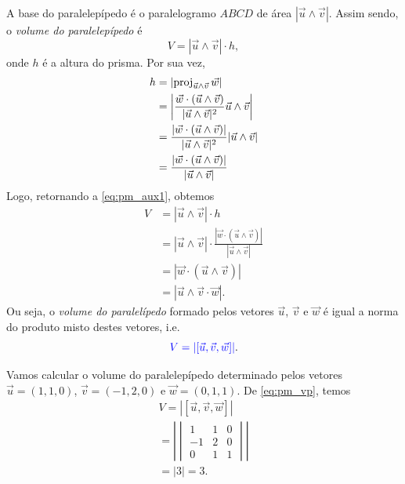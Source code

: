 A base do paralelepípedo é o paralelogramo $ABCD$ de área $|\vec{u}\land\vec{v}|$. Assim sendo, o \emph{volume do paralelepípedo} é
\begin{equation}\label{eq:pm_aux1}
  V = |\vec{u}\land\vec{v}|\cdot h,
\end{equation}
onde $h$ é a altura do prisma. Por sua vez,
\begin{align}
  h &= \left|\operatorname{proj}_{\vec{u}\land\vec{v}}\vec{w}\right| \\
    &= \left|\frac{\vec{w}\cdot(\vec{u}\land\vec{v})}{|\vec{u}\land\vec{v}|^2}\vec{u}\land\vec{v}\right|\\
    &= \frac{\left|\vec{w}\cdot(\vec{u}\land\vec{v})\right|}{|\vec{u}\land\vec{v}|^2}|\vec{u}\land\vec{v}|\\
    &= \frac{\left|\vec{w}\cdot(\vec{u}\land\vec{v})\right|}{|\vec{u}\land\vec{v}|} 
\end{align}
Logo, retornando a \eqref{eq:pm_aux1}, obtemos
\begin{align}
  V &= |\vec{u}\land\vec{v}|\cdot h\\
    &= |\vec{u}\land\vec{v}|\cdot\frac{\left|\vec{w}\cdot(\vec{u}\land\vec{v})\right|}{|\vec{u}\land\vec{v}|} \\
    &= \left|\vec{w}\cdot(\vec{u}\land\vec{v})\right|\\
    &= \left|\vec{u}\land\vec{v}\cdot\vec{w}\right|.
\end{align}
Ou seja, o \emph{volume do paralelípedo} formado pelos vetores $\vec{u}$, $\vec{v}$ e $\vec{w}$ é igual a norma do produto misto destes vetores, i.e.
\begin{equation}\label{eq:pm_vp}
  {\color{blue}V = |[\vec{u},\vec{v},\vec{w}]|}.
\end{equation}

\begin{ex}
  Vamos calcular o volume do paralelepípedo determinado pelos vetores $\vec{u}=(1,1,0)$, $\vec{v}=(-1,2,0)$ e $\vec{w}=(0,1,1)$. De \eqref{eq:pm_vp}, temos
  \begin{gather}
    V = |[\vec{u},\vec{v},\vec{w}]| \\
    = \left|
      \begin{vmatrix}
        1 & 1 & 0 \\
        -1 & 2 & 0 \\
        0 & 1 & 1
      \end{vmatrix}
    \right| \\
    = |3| = 3.
  \end{gather}
\end{ex}

